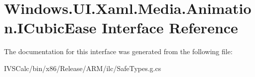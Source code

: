 \hypertarget{interface_windows_1_1_u_i_1_1_xaml_1_1_media_1_1_animation_1_1_i_cubic_ease}{}\section{Windows.\+U\+I.\+Xaml.\+Media.\+Animation.\+I\+Cubic\+Ease Interface Reference}
\label{interface_windows_1_1_u_i_1_1_xaml_1_1_media_1_1_animation_1_1_i_cubic_ease}


The documentation for this interface was generated from the following file\+:\begin{DoxyCompactItemize}
\item 
I\+V\+S\+Calc/bin/x86/\+Release/\+A\+R\+M/ilc/Safe\+Types.\+g.\+cs\end{DoxyCompactItemize}
